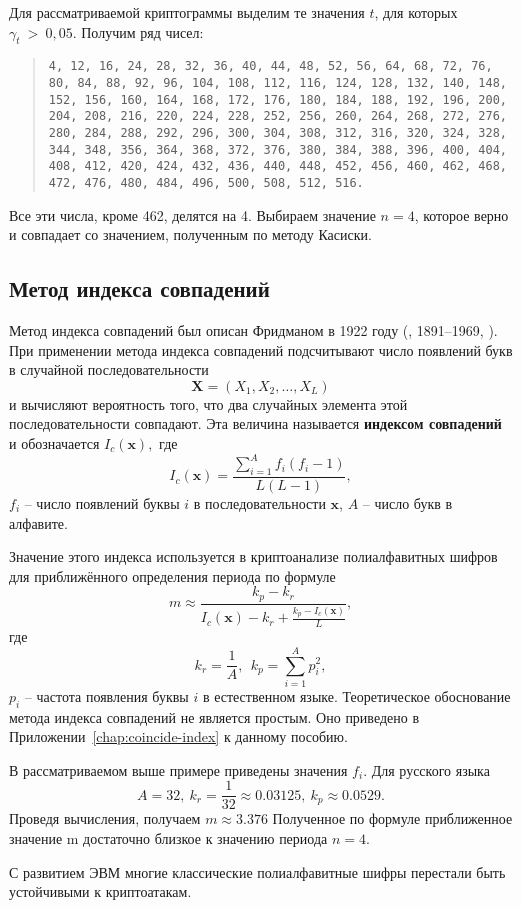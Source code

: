 \example
Для рассматриваемой криптограммы выделим те значения $t$, для которых $\gamma _t~>~0,05.$ Получим ряд чисел:

\begin{quote}
    \noindent \texttt{4, 12, 16, 24, 28, 32, 36, 40, 44, 48, 52, 56, 64, 68, 72, 76, 80, 84, 88, 92, 96, 104, 108, 112, 116, 124, 128, 132, 140, 148, 152, 156, 160, 164, 168, 172, 176, 180, 184, 188, 192, 196, 200, 204, 208, 216, 220, 224, 228, 252, 256, 260, 264, 268, 272, 276, 280, 284, 288, 292, 296, 300, 304, 308, 312, 316, 320, 324, 328, 344, 348, 356, 364, 368, 372, 376, 380, 384, 388, 396, 400, 404, 408, 412, 420, 424, 432, 436, 440, 448, 452, 456, 460, 462, 468, 472, 476, 480, 484, 496, 500, 508, 512, 516.}
\end{quote}

Все эти числа, кроме 462, делятся на 4. Выбираем значение $n=4$, которое верно и совпадает со значением, полученным по методу Касиски.
\exampleend


\subsection{Метод индекса совпадений}

Метод индекса совпадений был описан Фридманом в 1922 году (, 1891--1969, \cite{Friedman:1922}). При применении метода индекса совпадений подсчитывают число появлений букв в случайной последовательности
    \[ \mathbf{X} = (X_1 ,X_2 , \ldots , X_L ) \]
и вычисляют вероятность того, что два случайных элемента этой последовательности совпадают. Эта величина называется \textbf{индексом совпадений} и обозначается $I_{c}(\mathbf{x}),$ где
    \[ I_{c} (\mathbf{x}) = \frac{{\sum\limits_{i = 1}^A {f_i (f_i  - 1)} }} {{L(L - 1)}}, \]
$f_{i}$ -- число появлений буквы $i$ в последовательности $\mathbf{x}$, $A$ -- число букв в алфавите.

Значение этого индекса используется в криптоанализе полиалфавитных шифров для приближённого определения периода по формуле
    \[ m \approx \frac{{k_p  - k_r }} {{I_{c} (\mathbf{x}) - k_r  + \frac{{k_p  - I_{c} (\mathbf{x})}} {L}}}, \]
где
    \[ k_r  = \frac{1}{A}, ~~ k_p  = \sum\limits_{i=1}^A p_i^2, \]
$p_i $ -- частота появления буквы $i$ в естественном языке.
Теоретическое обоснование метода индекса совпадений не является простым. Оно приведено в Приложении~\ref{chap:coincide-index} к данному пособию.

\example
В рассматриваемом выше примере приведены значения $f_{i}$. Для русского языка
    \[ A=32, ~ k_{r} = \frac{1}{32} \approx 0.03125, ~ k_{p} \approx 0.0529. \]
Проведя вычисления, получаем $m \approx 3.376$ Полученное по формуле приближенное значение m достаточно близкое к значению периода $n=4$.
\exampleend

С развитием ЭВМ многие классические полиалфавитные шифры перестали быть устойчивыми к криптоатакам.
